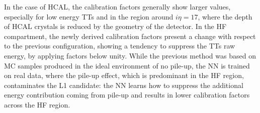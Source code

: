 In the case of HCAL, the calibration factors generally show larger values, especially for low energy TTs and in the region around $i\eta=17$, where the depth of HCAL crystals is reduced by the geometry of the detector. In the HF compartment, the newly derived calibration factors 
present a change with respect to the previous configuration, showing a tendency to suppress the TTs raw energy, by applying factors below unity. While the previous method was based on MC samples produced in the ideal environment of no pile-up, the NN is trained on real data, where the pile-up effect, which is predominant in the HF region, contaminates the L1 candidate: the NN learns how to suppress the additional energy contribution coming from pile-up and results in lower calibration factors across the HF region.

\bigbreak

